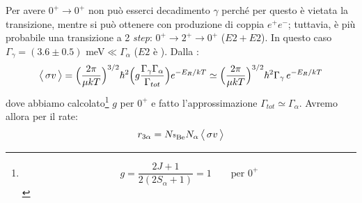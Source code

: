 \noindent Per avere $0^+\to0^+$ non può esserci decadimento $\gamma$ perché per questo è vietata la transizione, mentre si può ottenere con produzione di coppia $e^+e^-$; tuttavia, è più probabile una transizione a 2 \textit{step}: $0^+\to2^+\to0^+$ ($E2+E2$). In questo caso $\Gamma_\gamma = (3.6\pm 0.5)$ meV$\ll \Gamma_\alpha$ ($E2$ è ). Dalla \BW{}:
$$\bigl\langle\, \sigma v\, \bigr\rangle = \Bigl ( \frac{2\pi}{\mu kT} \Bigr )^{3/2} \hbar^2 \Bigl ( g \frac{\Gamma_\gamma\Gamma_\alpha}{\Gamma_{tot}} \Bigr ) e^{-E_R/kT}\simeq \Bigl ( \frac{2\pi}{\mu kT} \Bigr )^{3/2} \hbar^2 \Gamma_\gamma\, e^{-E_R/kT}$$
dove abbiamo calcolato\footnote{$$g=\frac{2J+1}{2(2S_\alpha +1)} = 1 \qquad \text{per } 0^+$$} $g$ per $0^+$ e fatto l'approssimazione $\Gamma_{tot} \simeq \Gamma_\alpha$. Avremo allora per il rate:
$$r_{3\alpha} = N_{\ce{^8Be}}N_\alpha \, \mean{\sigma v}$$




